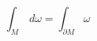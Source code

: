 \documentclass{article}
\begin{document}
\thispagestyle{empty}

\[
\int_M\,d\omega = \int_{\partial M}\omega
\]
\end{document}
